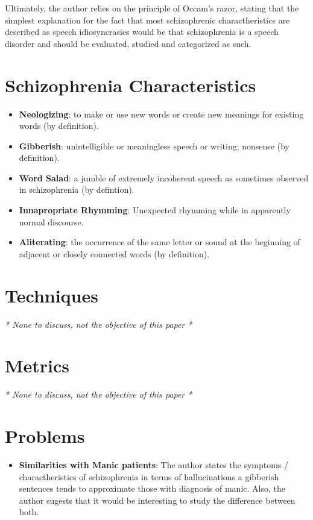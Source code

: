 \documentclass{Paper_Summary}
\begin{document}
    Ultimately, the author relies on the principle of Occam's razor, stating that the simplest explanation for the fact that most schizophrenic charactheristics are described as speech idiosyncrasies would be that schizophrenia is a speech disorder and should be evaluated, studied and categorized as such.

\breakline

\newpage

\section{Schizophrenia Characteristics}
    \begin{itemize}
        \item \textbf{Neologizing}: to make or use new words or create new meanings for existing words (by definition).
        \item \textbf{Gibberish}: unintelligible or meaningless speech or writing; nonsense (by definition).
        \item \textbf{Word Salad}: a jumble of extremely incoherent speech as sometimes observed in schizophrenia (by defintion).
        \item \textbf{Innapropriate Rhymming}: Unexpected rhymming while in apparently normal discourse.
        \item \textbf{Aliterating}: the occurrence of the same letter or sound at the beginning of adjacent or closely connected words (by definition).
    \end{itemize}

\section{Techniques}
    \emph{* None to discuss, not the objective of this paper *}

\section{Metrics}
    \emph{* None to discuss, not the objective of this paper *}

\section{Problems}
    \begin{itemize}
        \item \textbf{Similarities with Manic patients}: The author states the symptoms / charactheristics of schizophrenia in terms of hallucinations a gibberish sentences tends to approximate those with diagnosis of manic. Also, the author sugests that it would be interesting to study the difference between both.
    \end{itemize}
\end{document}
